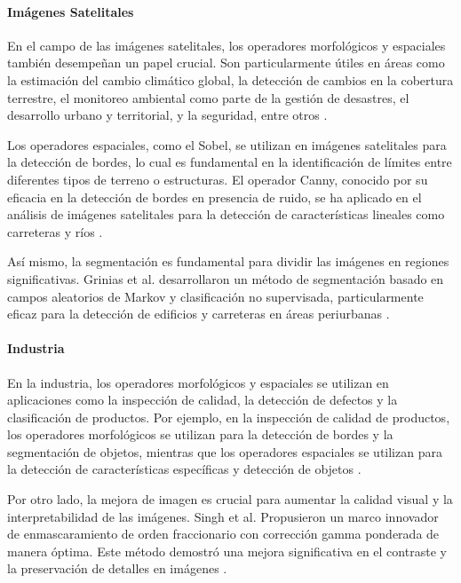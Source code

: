\paragraph{Imágenes Satelitales} En el campo de las imágenes satelitales, los operadores morfológicos y espaciales también desempeñan un papel crucial. Son particularmente útiles en áreas como la estimación del cambio climático global, la detección de cambios en la cobertura terrestre, el monitoreo ambiental como parte de la gestión de desastres, el desarrollo urbano y territorial, y la seguridad, entre otros \autocite{chang2017flexible}.

Los operadores espaciales, como el Sobel, se utilizan en imágenes satelitales para la detección de bordes, lo cual es fundamental en la identificación de límites entre diferentes tipos de terreno o estructuras. El operador Canny, conocido por su eficacia en la detección de bordes en presencia de ruido, se ha aplicado en el análisis de imágenes satelitales para la detección de características lineales como carreteras y ríos \autocite{abrahamEdgeDetectionSatellite2021}.

Así mismo, la segmentación es fundamental para dividir las imágenes en regiones significativas. Grinias et al. desarrollaron un método de segmentación basado en campos aleatorios de Markov y clasificación no supervisada, particularmente eficaz para la detección de edificios y carreteras en áreas periurbanas \autocite{grinias2016mrf}.\\



\paragraph{Industria} En la industria, los operadores morfológicos y espaciales se utilizan en aplicaciones como la inspección de calidad, la detección de defectos y la clasificación de productos. Por ejemplo, en la inspección de calidad de productos, los operadores morfológicos se utilizan para la detección de bordes y la segmentación de objetos, mientras que los operadores espaciales se utilizan para la detección de características específicas y detección de objetos  \autocite{demantPositioning2013,demantOverviewSegmentation2013,demantMarkIdentification2013}.

Por otro lado, la mejora de imagen es crucial para aumentar la calidad visual y la interpretabilidad de las imágenes. Singh et al. Propusieron un marco innovador de enmascaramiento de orden fraccionario con corrección gamma ponderada de manera óptima. Este método demostró una mejora significativa en el contraste y la preservación de detalles en imágenes \autocite{singh2017novel}.

